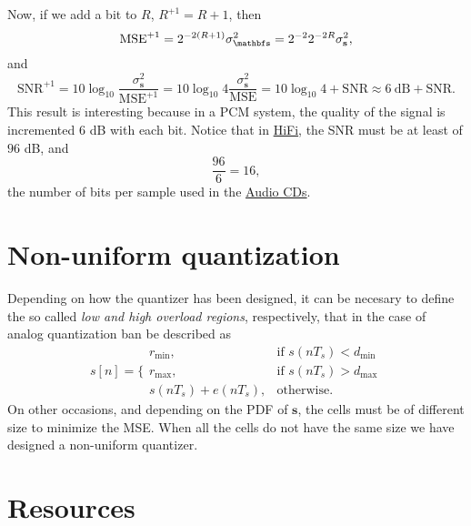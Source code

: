 Now, if we add a bit to $R$, $R^{+1}=R+1$, then
\begin{equation*}
  \text{MSE}^{+1}=2^{-2(R+1)}\sigma_{\mathbfs} ^2 = 2^{-2}2^{-2R}\sigma_{\mathbf s}^2,
\end{equation*}
and
\begin{equation*}
  \text{SNR}^{+1} = 10\log_{10}\frac{\sigma_{\mathbf s}^2}{\text{MSE}^{+1}} = 10\log_{10}4\frac{\sigma_{\mathbf s}^2}{\text{MSE}} =
  10\log_{10} 4 + \text{SNR} \approx  6~\text{dB} + \text{SNR}.
\end{equation*}
This result is interesting because in a PCM system, the quality of
the signal is incremented $6$ dB with each bit. Notice that in
\href{https://en.wikipedia.org/wiki/High_fidelity}{HiFi}, the SNR
must be at least of $96$ dB, and
\begin{equation*}
  \frac{96}{6} = 16,
\end{equation*}
the number of bits per sample used in the
\href{https://en.wikipedia.org/wiki/Compact_disc}{Audio CDs}.

\section{Non-uniform quantization}

Depending on how the quantizer has been designed, it can be necesary to define the so called \emph{low and high overload
regions}, respectively, that in the case of analog quantization ban be described as
\begin{equation}
  s[n] = \{\begin{array}{ll}
  r_{\text{min}}, & \text{if $s(nT_s)<d_{\text{min}}$} \\
  r_{\text{max}}, & \text{if $s(nT_s)>d_{\text{max}}$} \\
  s(nT_s)+e(nT_s), & \text{otherwise}.
  \end{array}
\end{equation}
On other occasions, and depending on the PDF of ${\mathbf s}$, the
cells must be of different size to minimize the MSE. When all the
cells do not have the same size we have designed a non-uniform
quantizer.

\section{Resources}


